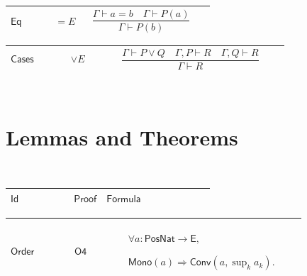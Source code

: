 \documentclass[12pt,reqno]{amsart}
\theoremstyle{blueplain}
\numberwithin{equation}{section}
\newlength{\FATOUOneColumnBody}
\begin{document}
{\scriptsize \setlength{\parskip}{0pt}\nointerlineskip
\noindent 
\begin{tabular}{|@{}>{\centering\arraybackslash}m{0.19251\linewidth}|>{\centering\arraybackslash}m{0.16845\linewidth}|>{\centering\arraybackslash}m{0.53904\linewidth}|}
\hline
\hypertarget{rule:Eq}{$\displaystyle \mathsf{Eq}$} & $\displaystyle =E$ & 
\rule[-3.3ex]{0pt}{7.8ex}$\displaystyle \dfrac{\Gamma\vdash
a=b\quad\Gamma\vdash P(a)}{\Gamma\vdash P(b)}$ \\ \hline
\end{tabular}%
}

{\scriptsize \setlength{\parskip}{0pt}\nointerlineskip
\noindent 
\begin{tabular}{|@{}>{\centering\arraybackslash}m{0.19251\linewidth}|>{\centering\arraybackslash}m{0.16845\linewidth}|>{\centering\arraybackslash}m{0.53904\linewidth}|}
\hline
\hypertarget{rule:Cases}{$\displaystyle \mathsf{Cases}$} & $\displaystyle %
\vee E$ & \rule[-3.3ex]{0pt}{7.8ex}$\displaystyle \dfrac{\Gamma\vdash P\lor
Q\quad\Gamma,P\vdash R\quad\Gamma,Q\vdash R}{\Gamma\vdash R}$ \\ \hline
\end{tabular}%
}

{\scriptsize \ }

\section{\protect\scriptsize Lemmas and Theorems}

{\scriptsize {\ }}

{\scriptsize \setlength{\parskip}{0pt}\nointerlineskip
\noindent 
\begin{tabular}{|@{}>{\centering\arraybackslash}m{\FATOUOneColumnBody}|}
\hline
$\displaystyle \mathsf{Lemmas}$ \\ \hline
\end{tabular}%
}

{\scriptsize \setlength{\parskip}{0pt}\nointerlineskip
\noindent 
\begin{tabular}{|@{}>{\centering\arraybackslash}m{0.19251\linewidth}|>{\centering\arraybackslash}m{0.16845\linewidth}|>{\centering\arraybackslash}m{0.53904\linewidth}|}
\hline
$\displaystyle \mathsf{Id}$ & $\displaystyle \mathsf{Proof}$ & $%
\displaystyle \mathsf{Formula}$ \\ \hline
\end{tabular}%
}

{\scriptsize \setlength{\parskip}{0pt}\nointerlineskip
\noindent 
\begin{tabular}{|@{}>{\centering\arraybackslash}m{0.19251\linewidth}|>{\centering\arraybackslash}m{0.16845\linewidth}|>{\centering\arraybackslash}m{0.53904\linewidth}|}
\hline
\hypertarget{lem:Order}{$\displaystyle \mathsf{Order}$} & \hyperlink{proof:O4}%
{$\displaystyle \mathsf{O4}$} & $\displaystyle \forall a:\mathsf{PosNat}\to%
\mathsf{E},$\par$\displaystyle \mathsf{Mono}(a)\Rightarrow\mathsf{Conv}%
(a,\sup_k a_k).$ \\ \hline
\end{tabular}%
}
\end{document}
